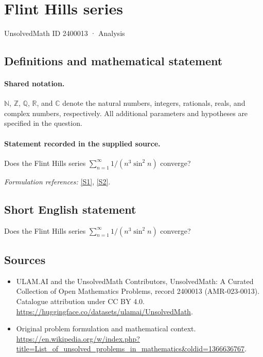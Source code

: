 \documentclass[11pt]{article}
\newcommand{\sref}[2]{\hyperlink{source:#1:#2}{[S#2]}}
\begin{document}
\setcounter{section}{2400012}
\section{Flint Hills series}\label{2400013}
{\small UnsolvedMath ID 2400013 · Analysis}
\subsection{Definitions and mathematical statement}

\paragraph{Shared notation.}$\mathbb N$, $\mathbb Z$, $\mathbb Q$, $\mathbb R$, and $\mathbb C$ denote the natural numbers, integers, rationals, reals, and complex numbers, respectively. All additional parameters and hypotheses are specified in the question.


\paragraph{Statement recorded in the supplied source.}
Does the Flint Hills series $\sum_{n=1}^{\infty} 1/(n^3\sin^2 n)$ converge?
\par\smallskip\textit{Formulation references:} \sref{2400013}{1}, \sref{2400013}{2}.
\subsection{Short English statement}
Does the Flint Hills series $\sum_{n=1}^{\infty} 1/(n^3\sin^2 n)$ converge?
\subsection{Sources}
\begin{itemize}
\item[\hypertarget{source:2400013:1}{S1}] ULAM.AI and the UnsolvedMath Contributors, UnsolvedMath: A Curated Collection of Open Mathematics Problems, record 2400013 (AMR-023-0013). Catalogue attribution under CC BY 4.0.
\url{https://huggingface.co/datasets/ulamai/UnsolvedMath}.
\item[\hypertarget{source:2400013:2}{S2}] Original problem formulation and mathematical context.
\url{https://en.wikipedia.org/w/index.php?title=List_of_unsolved_problems_in_mathematics&oldid=1366636767}.
\end{itemize}
\label{end:2400013}
\end{document}
